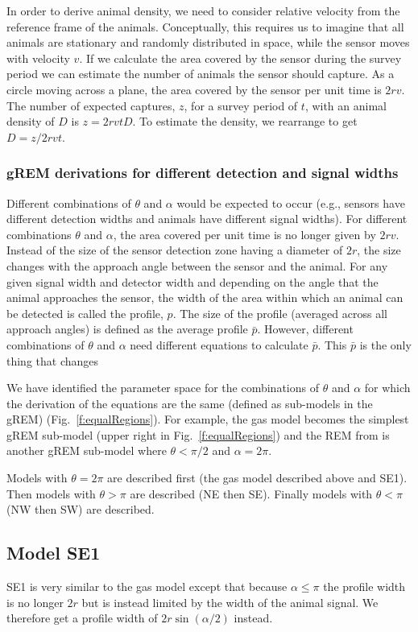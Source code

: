 In order to derive animal density, we need to consider relative velocity from the reference frame of the animals. Conceptually, this requires us to imagine that all animals are stationary and randomly distributed in space, while the sensor moves with velocity $v$. If we calculate the area covered by the sensor during the survey period we can estimate the number of animals the sensor should capture. As a circle moving across a plane, the area covered by the sensor per unit time is $2rv$. The number of expected captures, $z$, for a survey period of $t$, with an animal density of $D$ is $z = 2rvtD$. To estimate the density, we rearrange to get $D = z/2rvt$.

\subsubsection{gREM derivations for different detection and signal widths}
Different combinations of $\theta$ and $\alpha$ would be expected to occur (e.g., sensors have different detection widths and animals have different signal widths). For different combinations $\theta$ and $\alpha$, the area covered per unit time is no longer given by $2rv$. Instead of the size of the sensor detection zone having a diameter of $2r$, the size changes with the approach angle between the sensor and the animal. For any given signal width and detector width and depending on the angle that the animal approaches the sensor, the width of the area within which an animal can be detected is called the profile, $p$. The size of the profile (averaged across all approach angles) is defined as the average profile $\bar{p}$. However, different combinations of $\theta$ and $\alpha$ need different equations to calculate $\bar{p}$. This $\bar{p}$ is the only thing that changes 

We have identified the parameter space for the combinations of $\theta$ and $\alpha$ for which the derivation of the equations are the same (defined as sub-models in the gREM) (Fig.~\ref{f:equalRegions}). For example, the gas model becomes the simplest gREM sub-model (upper right in Fig.~\ref{f:equalRegions}) and the REM from \cite{rowcliffe2008estimating} is another gREM sub-model where $\theta<\pi/2$ and $\alpha = 2\pi$.

Models with $\theta = 2\pi$ are described first (the gas model described above and SE1). Then models with $\theta > \pi$ are described (NE then SE). Finally models with $\theta < \pi$ (NW then SW) are described. 

\subsection{Model SE1} \label{SE1}
SE1 is very similar to the gas model except that because $\alpha \le \pi$ the profile width is no longer $2r$ but is instead limited by the width of the animal signal. We therefore get a profile width of $2r\sin(\alpha/2)$ instead. 

